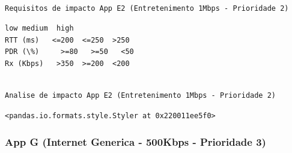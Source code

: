 \documentclass[11pt]{article}
\begin{document}
    \begin{Verbatim}[commandchars=\\\{\}]

Requisitos de impacto App E2 (Entretenimento 1Mbps - Prioridade 2)

    \end{Verbatim}

    
    \begin{Verbatim}[commandchars=\\\{\}]
             low medium  high
RTT (ms)   <=200  <=250  >250
PDR (\%)     >=80   >=50   <50
Rx (Kbps)   >350  >=200  <200
    \end{Verbatim}

    
    \begin{Verbatim}[commandchars=\\\{\}]

Analise de impacto App E2 (Entretenimento 1Mbps - Prioridade 2)

    \end{Verbatim}

    
    \begin{Verbatim}[commandchars=\\\{\}]
<pandas.io.formats.style.Styler at 0x220011ee5f0>
    \end{Verbatim}

    
    \hypertarget{app-g-internet-generica---500kbps---prioridade-3}{%
\subsubsection{App G (Internet Generica - 500Kbps - Prioridade
3)}\label{app-g-internet-generica---500kbps---prioridade-3}}
\end{document}
